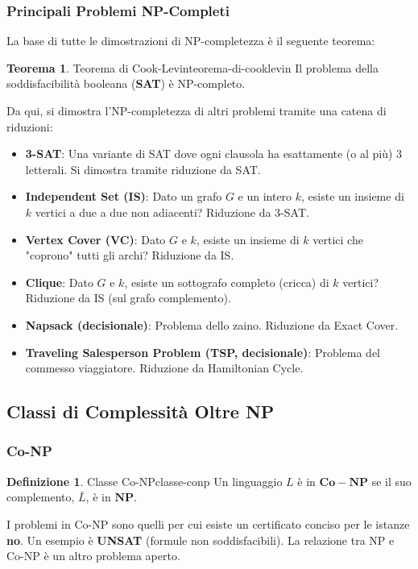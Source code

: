 \documentclass[a4paper]{article}
\theoremstyle{definition} %
\newtheorem{theorem}{Teorema}
\newtheorem{definition}{Definizione}
\begin{document}
\subsubsection{Principali Problemi NP-Completi}
La base di tutte le dimostrazioni di NP-completezza è il seguente teorema:
\begin{theorem}{Teorema di Cook-Levin}{teorema-di-cooklevin}
Il problema della soddisfacibilità booleana (\textbf{SAT}) è NP-completo.
\end{theorem}
Da qui, si dimostra l'NP-completezza di altri problemi tramite una catena di riduzioni:
\begin{itemize}
    \item \textbf{3-SAT}: Una variante di SAT dove ogni clausola ha esattamente (o al più) 3 letterali. Si dimostra tramite riduzione da SAT.
    \item \textbf{Independent Set (IS)}: Dato un grafo $G$ e un intero $k$, esiste un insieme di $k$ vertici a due a due non adiacenti? Riduzione da 3-SAT.
    \item \textbf{Vertex Cover (VC)}: Dato $G$ e $k$, esiste un insieme di $k$ vertici che "coprono" tutti gli archi? Riduzione da IS.
    \item \textbf{Clique}: Dato $G$ e $k$, esiste un sottografo completo (cricca) di $k$ vertici? Riduzione da IS (sul grafo complemento).
    \item \textbf{Napsack (decisionale)}: Problema dello zaino. Riduzione da Exact Cover.
    \item \textbf{Traveling Salesperson Problem (TSP, decisionale)}: Problema del commesso viaggiatore. Riduzione da Hamiltonian Cycle.
\end{itemize}

\subsection{Classi di Complessità Oltre NP}
\subsubsection{Co-NP}
\begin{definition}{Classe Co-NP}{classe-conp}
Un linguaggio $L$ è in $\mathbf{Co-NP}$ se il suo complemento, $\bar{L}$, è in $\mathbf{NP}$.
\end{definition}
I problemi in Co-NP sono quelli per cui esiste un certificato conciso per le istanze \textbf{no}. Un esempio è \textbf{UNSAT} (formule non soddisfacibili). La relazione tra NP e Co-NP è un altro problema aperto.
\end{document}
